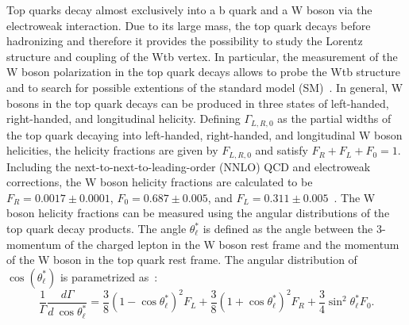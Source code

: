 \documentclass[a4paper]{PoS}
\begin{document}
Top quarks decay almost exclusively into a b quark and a W boson via the
electroweak interaction. Due to its large mass, the top quark decays before
hadronizing and therefore it provides the possibility to study the Lorentz
structure and coupling of the Wtb vertex. In particular, the measurement of the
W boson polarization in the top quark decays allows to probe the Wtb structure
and to search for possible extentions of the standard model (SM)~\cite{Wtb}. In
general, W bosons in the top quark decays can be produced in three states of
left-handed, right-handed, and longitudinal helicity.
Defining $\Gamma_{L,R,0}$ as the partial widths of the top quark decaying into
left-handed, right-handed, and longitudinal W boson helicities, the helicity
fractions are given by $F_{L,R,0}$ and satisfy $F_R + F_L + F_0 = 1$. Including
the next-to-next-to-leading-order (NNLO) QCD and electroweak corrections,
the W boson helicity fractions are
calculated to be $F_R = 0.0017 \pm 0.0001$, $F_0 = 0.687 \pm 0.005$, and
$F_L = 0.311 \pm 0.005$~\cite{nnlo-helicity}. The W boson helicity fractions can
be measured using the angular distributions of the top quark decay products. The
angle $\theta_{\ell}^{*}$ is defined as the angle between the 3-momentum of the
charged lepton in the W boson rest frame and the momentum of the W boson in the
top quark rest frame. The angular distribution of $\cos(\theta_{\ell}^{*})$ is
parametrized as~\cite{theta-parametrization}:
%
\begin{equation*}
\frac{1}{\Gamma}\frac{d\Gamma}{d~\cos\theta_{\ell}^*} =
\frac{3}{8}\left(1 - \cos\theta_{\ell}^*\right)^2F_L +
\frac{3}{8}\left(1 + \cos\theta_{\ell}^*\right)^2F_R +
\frac{3}{4}\sin^2\theta_{\ell}^*F_0.
\end{equation*}
\end{document}
